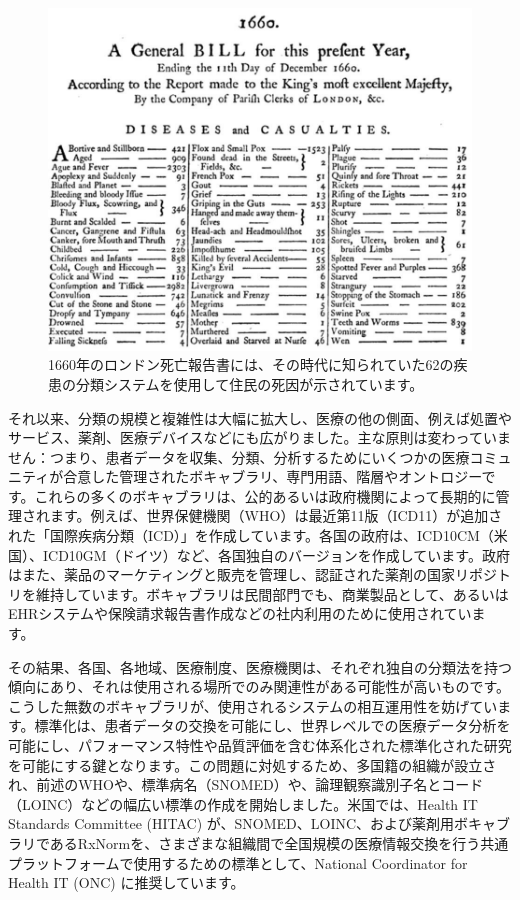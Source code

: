 \documentclass[
  11pt]{book}
\theoremstyle{definition}
\theoremstyle{definition}
\theoremstyle{definition}
\theoremstyle{definition}
\theoremstyle{remark}
\begin{document}
\begin{figure}

{\centering \includegraphics[width=1\linewidth]{images/StandardizedVocabularies/bill} 

}

\caption{1660年のロンドン死亡報告書には、その時代に知られていた62の疾患の分類システムを使用して住民の死因が示されています。}\label{fig:bill}
\end{figure}

それ以来、分類の規模と複雑性は大幅に拡大し、医療の他の側面、例えば処置やサービス、薬剤、医療デバイスなどにも広がりました。主な原則は変わっていません：つまり、患者データを収集、分類、分析するためにいくつかの医療コミュニティが合意した管理されたボキャブラリ、専門用語、階層やオントロジーです。これらの多くのボキャブラリは、公的あるいは政府機関によって長期的に管理されます。例えば、世界保健機関（WHO）は最近第11版（ICD11）が追加された「国際疾病分類（ICD）」を作成しています。各国の政府は、ICD10CM（米国）、ICD10GM（ドイツ）など、各国独自のバージョンを作成しています。政府はまた、薬品のマーケティングと販売を管理し、認証された薬剤の国家リポジトリを維持しています。ボキャブラリは民間部門でも、商業製品として、あるいはEHRシステムや保険請求報告書作成などの社内利用のために使用されています。

その結果、各国、各地域、医療制度、医療機関は、それぞれ独自の分類法を持つ傾向にあり、それは使用される場所でのみ関連性がある可能性が高いものです。こうした無数のボキャブラリが、使用されるシステムの相互運用性を妨げています。標準化は、患者データの交換を可能にし、世界レベルでの医療データ分析を可能にし、パフォーマンス特性や品質評価を含む体系化された標準化された研究を可能にする鍵となります。この問題に対処するため、多国籍の組織が設立され、前述のWHOや、標準病名（SNOMED）や、論理観察識別子名とコード（LOINC）などの幅広い標準の作成を開始しました。米国では、Health IT Standards Committee (HITAC) が、SNOMED、LOINC、および薬剤用ボキャブラリであるRxNormを、さまざまな組織間で全国規模の医療情報交換を行う共通プラットフォームで使用するための標準として、National Coordinator for Health IT (ONC) に推奨しています。
\end{document}
